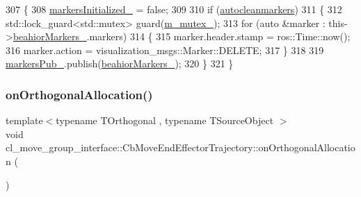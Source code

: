 \begin{DoxyCode}
307     \{
308         \hyperlink{classcl__move__group__interface_1_1CbMoveEndEffectorTrajectory_ac140a7f0adfb20f1e2900a5c8cd2ca5b}{markersInitialized\_} = \textcolor{keyword}{false};
309 
310         \textcolor{keywordflow}{if} (\hyperlink{classcl__move__group__interface_1_1CbMoveEndEffectorTrajectory_a790c30b94509dc6f4d0064f6356a04db}{autocleanmarkers})
311         \{
312             std::lock\_guard<std::mutex> guard(\hyperlink{classcl__move__group__interface_1_1CbMoveEndEffectorTrajectory_a2a98ef725cb3fc7f61654d3d6a2066bb}{m\_mutex\_});
313             \textcolor{keywordflow}{for} (\textcolor{keyword}{auto} &marker : this->\hyperlink{classcl__move__group__interface_1_1CbMoveEndEffectorTrajectory_a809fb5385adf27c0a1c8f8136566949c}{beahiorMarkers\_}.markers)
314             \{
315                 marker.header.stamp = ros::Time::now();
316                 marker.action = visualization\_msgs::Marker::DELETE;
317             \}
318 
319             \hyperlink{classcl__move__group__interface_1_1CbMoveEndEffectorTrajectory_aabc2216b2d8625fecd83c5ec69928e63}{markersPub\_}.publish(\hyperlink{classcl__move__group__interface_1_1CbMoveEndEffectorTrajectory_a809fb5385adf27c0a1c8f8136566949c}{beahiorMarkers\_});
320         \}
321     \}
\end{DoxyCode}
\mbox{\label{classcl__move__group__interface_1_1CbMoveEndEffectorTrajectory_aae4797fba54cb3bf371cc67d26a82186}} 
\subsubsection{\texorpdfstring{on\+Orthogonal\+Allocation()}{onOrthogonalAllocation()}}
{\footnotesize\ttfamily template$<$typename T\+Orthogonal , typename T\+Source\+Object $>$ \\
void cl\+\_\+move\+\_\+group\+\_\+interface\+::\+Cb\+Move\+End\+Effector\+Trajectory\+::on\+Orthogonal\+Allocation (\begin{DoxyParamCaption}{ }\end{DoxyParamCaption})\hspace{0.3cm}{\ttfamily [inline]}}



